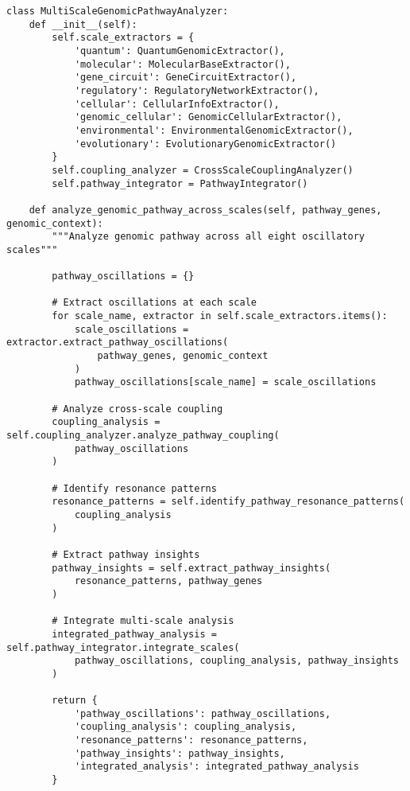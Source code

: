 \documentclass[12pt,a4paper]{article}
\begin{document}
\begin{lstlisting}[style=pythonstyle, caption=Multi-Scale Genomic Pathway Oscillatory Analysis]
class MultiScaleGenomicPathwayAnalyzer:
    def __init__(self):
        self.scale_extractors = {
            'quantum': QuantumGenomicExtractor(),
            'molecular': MolecularBaseExtractor(),
            'gene_circuit': GeneCircuitExtractor(),
            'regulatory': RegulatoryNetworkExtractor(),
            'cellular': CellularInfoExtractor(),
            'genomic_cellular': GenomicCellularExtractor(),
            'environmental': EnvironmentalGenomicExtractor(),
            'evolutionary': EvolutionaryGenomicExtractor()
        }
        self.coupling_analyzer = CrossScaleCouplingAnalyzer()
        self.pathway_integrator = PathwayIntegrator()
        
    def analyze_genomic_pathway_across_scales(self, pathway_genes, genomic_context):
        """Analyze genomic pathway across all eight oscillatory scales"""
        
        pathway_oscillations = {}
        
        # Extract oscillations at each scale
        for scale_name, extractor in self.scale_extractors.items():
            scale_oscillations = extractor.extract_pathway_oscillations(
                pathway_genes, genomic_context
            )
            pathway_oscillations[scale_name] = scale_oscillations
        
        # Analyze cross-scale coupling
        coupling_analysis = self.coupling_analyzer.analyze_pathway_coupling(
            pathway_oscillations
        )
        
        # Identify resonance patterns
        resonance_patterns = self.identify_pathway_resonance_patterns(
            coupling_analysis
        )
        
        # Extract pathway insights
        pathway_insights = self.extract_pathway_insights(
            resonance_patterns, pathway_genes
        )
        
        # Integrate multi-scale analysis
        integrated_pathway_analysis = self.pathway_integrator.integrate_scales(
            pathway_oscillations, coupling_analysis, pathway_insights
        )
        
        return {
            'pathway_oscillations': pathway_oscillations,
            'coupling_analysis': coupling_analysis,
            'resonance_patterns': resonance_patterns,
            'pathway_insights': pathway_insights,
            'integrated_analysis': integrated_pathway_analysis
        }
    

\end{lstlisting}
\end{document}
